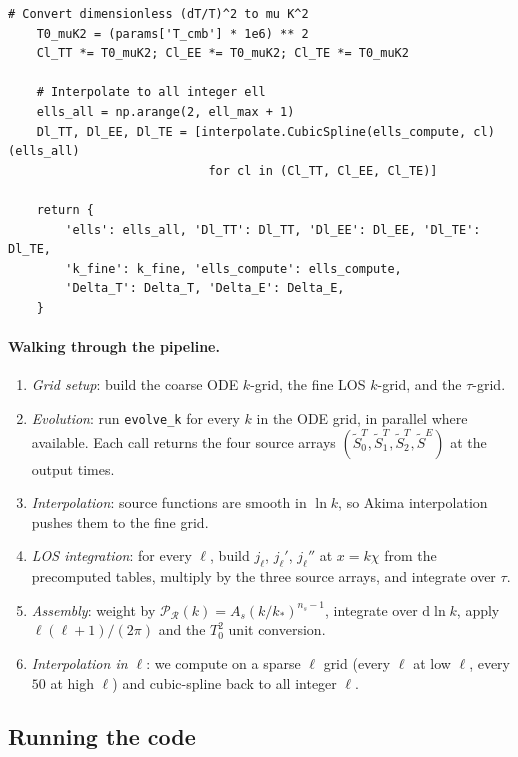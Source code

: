 \begin{codebox}
\begin{lstlisting}[style=python]
    # Convert dimensionless (dT/T)^2 to mu K^2
    T0_muK2 = (params['T_cmb'] * 1e6) ** 2
    Cl_TT *= T0_muK2; Cl_EE *= T0_muK2; Cl_TE *= T0_muK2

    # Interpolate to all integer ell
    ells_all = np.arange(2, ell_max + 1)
    Dl_TT, Dl_EE, Dl_TE = [interpolate.CubicSpline(ells_compute, cl)(ells_all)
                            for cl in (Cl_TT, Cl_EE, Cl_TE)]

    return {
        'ells': ells_all, 'Dl_TT': Dl_TT, 'Dl_EE': Dl_EE, 'Dl_TE': Dl_TE,
        'k_fine': k_fine, 'ells_compute': ells_compute,
        'Delta_T': Delta_T, 'Delta_E': Delta_E,
    }
\end{lstlisting}
\end{codebox}

\paragraph{Walking through the pipeline.}
\begin{enumerate}
  \item \emph{Grid setup}: build the coarse ODE $k$-grid, the fine LOS $k$-grid, and the $\tau$-grid.
  \item \emph{Evolution}: run \texttt{evolve\_k} for every $k$ in the ODE grid, in parallel where available. Each call returns the four source arrays $(\widetilde S^T_0, \widetilde S^T_1, \widetilde S^T_2, \widetilde S^E)$ at the output times.
  \item \emph{Interpolation}: source functions are smooth in $\ln k$, so Akima interpolation pushes them to the fine grid.
  \item \emph{LOS integration}: for every $\ell$, build $j_\ell$, $j_\ell'$, $j_\ell''$ at $x = k\chi$ from the precomputed tables, multiply by the three source arrays, and integrate over $\tau$.
  \item \emph{Assembly}: weight by $\mathcal{P}_\mathcal{R}(k) = A_s (k/k_*)^{n_s - 1}$, integrate over $\mathrm{d}\ln k$, apply $\ell(\ell + 1)/(2\pi)$ and the $T_0^2$ unit conversion.
  \item \emph{Interpolation in $\ell$}: we compute on a sparse $\ell$ grid (every $\ell$ at low $\ell$, every $50$ at high $\ell$) and cubic-spline back to all integer $\ell$.
\end{enumerate}

\subsection{Running the code}

